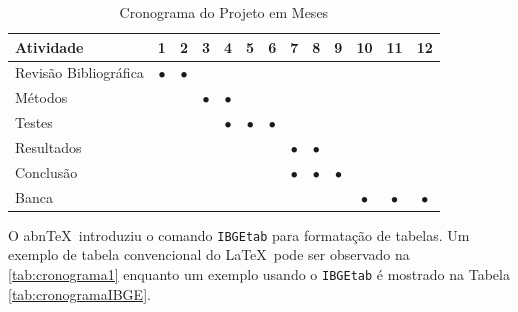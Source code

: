 \documentclass[
    12pt,				       %
    openright,			       %
    oneside,			       %
    a4paper,			       %
    chapter=TITLE,             %
    sumario=tradicional,       %
    english,			        %
    brazil, 				    %
 ]{abntex2}
\begin{document}
\begin{table}[htbp]
    \centering
    \caption[Cronograma Normal]{Cronograma do Projeto em Meses}
    \label{tab:cronograma1}
    \begin{tabular}{lcccccccccccc} %
        \toprule
        \textbf{Atividade} & \textbf{1} & \textbf{2} & \textbf{3} & \textbf{4} & \textbf{5} & \textbf{6} & \textbf{7} & \textbf{8} & \textbf{9} & \textbf{10} & \textbf{11} & \textbf{12} \\
        \midrule
            Revisão Bibliográfica & $\bullet$ & $\bullet$ & & & & & & & & & & \\
            Métodos & & & $\bullet$ & $\bullet$ & & & & & & & & \\
            Testes & & & & $\bullet$ & $\bullet$ & $\bullet$ & & & & & & \\
            Resultados & & & & & & & $\bullet$ & $\bullet$ & & & & \\
            Conclusão & & & & & & & $\bullet$ & $\bullet$ & $\bullet$ & & & \\
            Banca & & & & & & &&&& $\bullet$ & $\bullet$ & $\bullet$ \\
        \bottomrule
    \end{tabular}
\end{table}

O abn\TeX\ introduziu o comando \texttt{IBGEtab} para formatação de tabelas. Um exemplo de tabela convencional do \LaTeX\ pode ser observado na \autoref{tab:cronograma1} enquanto um exemplo usando o \texttt{IBGEtab} é mostrado na Tabela \autoref{tab:cronogramaIBGE}.

\begin{table}[htbp]
\end{table}%
\end{document}
